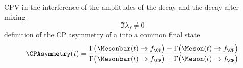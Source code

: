 CPV in the interference of the amplitudes of the decay and the decay after mixing
%
\begin{equation}
  \Im \lambda_f \neq 0   
\end{equation}
%
definition of the CP asymmetry of a \Meson into a common \CP final state
%
\begin{equation}
  \CPAsymmetry(t) = \frac{\Gamma \bigl(\Mesonbar (t) \to f_{\text{\CP}}\bigr) - \Gamma \bigl(\Meson (t) \to f_{\text{\CP}}\bigr)}
                         {\Gamma \bigl(\Mesonbar (t) \to f_{\text{\CP}}\bigr) + \Gamma \bigl(\Meson (t) \to f_{\text{\CP}}\bigr)}
\end{equation}


